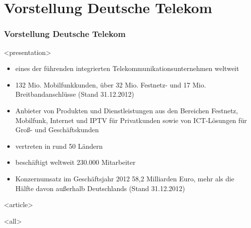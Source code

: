 
\section{Vorstellung Deutsche Telekom}

\begin{frame}[fragile]
\frametitle<presentation>{Vorstellung Deutsche Telekom}




\mode
<presentation>
\begin{itemize}
\item eines der führenden integrierten Telekommunikationsunternehmen weltweit
\item 132 Mio. Mobilfunkkunden, über 32 Mio. Festnetz- und 17 Mio. Breitbandanschlüsse (Stand 31.12.2012)
\item Anbieter von Produkten und Dienstleistungen aus den Bereichen Festnetz, Mobilfunk, Internet und IPTV für Privatkunden
sowie von ICT-Lösungen für Groß- und Geschäftskunden
\item vertreten in rund 50 Ländern
\item beschäftigt weltweit 230.000 Mitarbeiter
\item Konzernumsatz im Geschäftsjahr 2012 58,2 Milliarden Euro, mehr als die Hälfte davon außerhalb Deutschlands (Stand 31.12.2012)
\end{itemize}


\mode
<article>


\mode
<all>

\end{frame}
\newpage
\clearpage